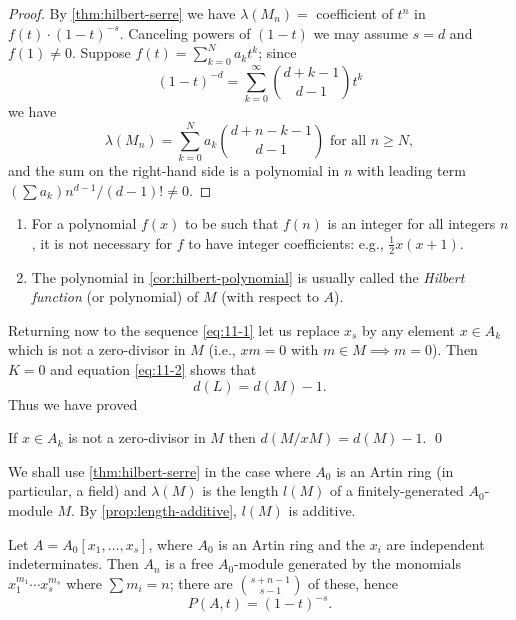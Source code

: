 \begin{proof}
By \eqref{thm:hilbert-serre} we have $\lambda(M_n) = $ coefficient of $t^n$ in $f(t) \cdot (1 - t)^{-s}$. Canceling powers of $(1 - t)$ we may assume $s = d$ and $f(1) \neq 0$. Suppose $f(t) = \sum_{k=0}^N a_k t^k$; since
\[
    (1 - t)^{-d} = \sum_{k=0}^\infty \binom{d+k-1}{d-1} t^k
\]
we have
\[
    \lambda(M_n) = \sum_{k=0}^N a_k \binom{d+n-k-1}{d-1} \text{ for all } n \geq N,
\]
and the sum on the right-hand side is a polynomial in $n$ with leading term $(\sum a_k)n^{d-1}/(d - 1)! \neq 0$.
\end{proof}

\begin{remark}
\begin{enumerate}[1)]
    \item For a polynomial $f(x)$ to be such that $f(n)$ is an integer for all integers $n$, it is not necessary for $f$ to have integer coefficients: e.g., $\frac{1}{2}x(x + 1)$.
    
    \item The polynomial in \eqref{cor:hilbert-polynomial} is usually called the \emph{Hilbert function} (or polynomial) of $M$ (with respect to $A$).
\end{enumerate}
\end{remark}

Returning now to the sequence \eqref{eq:11-1} let us replace $x_s$ by any element $x \in A_k$ which is not a zero-divisor in $M$ (i.e., $xm = 0$ with $m \in M \implies m = 0$). Then $K = 0$ and equation \eqref{eq:11-2} shows that
\[
    d(L) = d(M) - 1.
\]
Thus we have proved

\begin{proposition}\label{prop:hilbert-nonzerodivisor}
If $x \in A_k$ is not a zero-divisor in $M$ then $d(M/xM) = d(M) - 1$. \qed
\end{proposition}

We shall use \eqref{thm:hilbert-serre} in the case where $A_0$ is an Artin ring (in particular, a field) and $\lambda(M)$ is the length $l(M)$ of a finitely-generated $A_0$-module $M$. By \eqref{prop:length-additive}, $l(M)$ is additive.

\begin{example}
Let $A = A_0[x_1, \ldots, x_s]$, where $A_0$ is an Artin ring and the $x_i$ are independent indeterminates. Then $A_n$ is a free $A_0$-module generated by the monomials $x_1^{m_1} \cdots x_s^{m_s}$ where $\sum m_i = n$; there are $\binom{s+n-1}{s-1}$ of these, hence
\[
    P(A, t) = (1 - t)^{-s}.
\]
\end{example}

